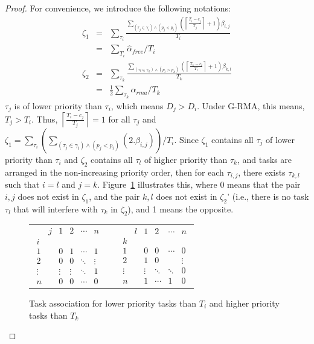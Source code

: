 \documentclass[12pt,english]{report}
\providecommand{\tabularnewline}{\\}
\newtheorem{proof}{Proof}
\providecommand{\tabularnewline}{\\}
\begin{document}
\begin{proof}
For convenience, we introduce the following notations:
\begin{eqnarray}
\zeta_{1}& = & \sum_{\tau_{i}}\frac{\sum_{\left(\tau_{j}\in\gamma_{i}\right)\wedge\left(p_{j}<p_{i}\right)}\left(\left\lceil\frac{T_{i}-c_{j}}{T_{j}}\right\rceil+1\right)\beta_{i,j}}{T_{i}}\nonumber\\
& = & \sum_{T_i} \hat{\alpha}_{free}/T_i
\nonumber\\
\zeta_{2} 
& = & \sum_{\tau_{k}}\frac{\sum_{\left(\tau_{l}\in\gamma_{k}\right)\wedge\left(p_{l}>p_{k}\right)}\left(\left\lceil\frac{T_{k}-c_{l}}{T_{l}}\right\rceil+1\right)\beta_{k,l}}{T_{k}}\nonumber\\
& = & \frac{1}{2}\sum_{\tau_k} \alpha_{rma}/T_k\nonumber
\end{eqnarray}
$\tau_{j}$ is of lower priority than $\tau_{i}$, which means $D_{j}>D_{i}$. Under G-RMA, this means, $T_{j}>T_{i}$.
Thus, $\left\lceil\frac{T_{i}-c_{j}}{T_{j}}\right\rceil=1$ for
all $\tau_{j}$ and $\zeta_{1}=\sum_{\tau_{i}}(\sum_{(\tau_{j}\in\gamma_{i})\wedge(p_{j}<p_{i})}(2.\beta_{i,j}))/T_{i}$.
Since $\zeta_{1}$ contains all $\tau_{j}$ of lower priority than
$\tau_{i}$ and $\zeta_{2}$ contains all $\tau_{l}$ of higher priority than $\tau_{k}$, 
and tasks are arranged in the non-increasing priority order, then for each $\tau_{i,j}$, there exists $\tau_{k,l}$ such
that $i=l$ and $j=k$. Figure~\ref{fig:matrix-example} illustrates this, where 0 means that the pair $i,j$ 
does not exist in $\zeta_{1}$,
and the pair $k,l$ does not exist in $\zeta_{2}$' (i.e., 
there is no task $\tau_l$ that will interfere with $\tau_k$ in $\zeta_2$), 
and 1 means the opposite. 

\begin{figure}[htbp]
\centering
\begin{tabular}{ccc}
$\begin{array}{cccccc}
 & j & 1 & 2 & \cdots & n\\
i\\
1 &  & 0 & 1 & \cdots & 1\\
2 &  & 0 & 0 & \ddots & \vdots\\
\vdots &  & \vdots & \vdots & \ddots & 1\\
n &  & 0 & 0 & \cdots & 0\end{array}$ &  & $\begin{array}{cccccc}
 & l & 1 & 2 & \cdots & n\\
k\\
1 &  & 0 & 0 & \cdots & 0\\
2 &  & 1 & 0 &  & \vdots\\
\vdots &  & \vdots & \ddots & \ddots & 0\\
n &  & 1 & \cdots & 1 & 0\end{array}$\tabularnewline
\end{tabular}
\caption{\label{fig:matrix-example} Task association for lower priority tasks than $T_i$ and higher priority tasks than $T_k$}
\end{figure}



\end{proof}
\end{document}
